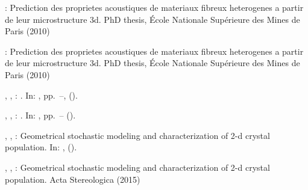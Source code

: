 \documentclass[numbers,compress,v1.0.1]{vmsta}
\theoremstyle{definition}
\begin{document}
\begin{thebibliography}{32}
%
\begin{botherref}
:
Prediction des proprietes acoustiques de materiaux fibreux heterogenes
a partir
de leur microstructure 3d.
PhD thesis,
{\'E}cole Nationale Sup{\'e}rieure des Mines de Paris
(2010)
\end{botherref}
%
%
\OrigBibText
%
\begin{botherref}
:
Prediction des proprietes acoustiques de materiaux fibreux heterogenes
a partir
de leur microstructure 3d.
PhD thesis,
{\'E}cole Nationale Sup{\'e}rieure des Mines de Paris
(2010)
\end{botherref}
%
\endOrigBibText
{}%
\endbibitem

%
\begin{bchapter}
,
,
:
.
In: ,
pp.~--,
().
\end{bchapter}
%
%
\OrigBibText
%
\begin{bchapter}
,
,
:
.
In: ,
pp.~--
().
\end{bchapter}
%
\endOrigBibText
{}%
\endbibitem\goodbreak

%
\begin{botherref}
,
,
:
Geometrical stochastic modeling and characterization of 2-d crystal population.
In: ,
().

\end{botherref}
%
%
\OrigBibText
%
\begin{botherref}
,
,
:
Geometrical stochastic modeling and characterization of 2-d crystal population.
Acta Stereologica
(2015)
\end{botherref}
%
\endOrigBibText
{}%
\endbibitem


\end{thebibliography}
\end{document}
